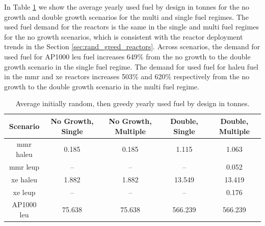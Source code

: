 In Table \ref{tab:rand_greed_used_avg} we show the average yearly used fuel by design in tonnes for the no growth and double growth scenarios for the multi and single fuel regimes. The used fuel demand for the reactors is the same in the single and multi fuel regimes for the no growth scenarios, which is consistent with the reactor deployment trends in the Section \ref{sec:rand_greed_reactors}. Across scenarios, the demand for used fuel for AP1000 \gls{leu} fuel increases 649\% from the no growth to the double growth scenario in the single fuel regime. The demand for used fuel for \gls{haleu} fuel in the \gls{mmr} and \gls{xe} reactors increases 503\% and 620\% respectively from the no growth to the double growth scenario in the multi fuel regime.

  \begin{table}[H]
    \centering
    \caption{Average initially random, then greedy yearly used fuel by design in tonnes.}
    \label{tab:rand_greed_used_avg}
    \begin{tabular}{c c c c c}
       \hline
       Scenario & No Growth, Single & No Growth, Multiple & Double, Single & Double, Multiple  \\
       \hline
       \gls{mmr} \gls{haleu}   & 0.185    & 0.185   & 1.115    & 1.063    \\
       \gls{mmr} \gls{leup}    & --       & --      & --       & 0.052    \\
       \gls{xe} \gls{haleu}    & 1.882    & 1.882   & 13.549   & 13.419   \\
       \gls{xe} \gls{leup}     & --       & --      & --       & 0.176    \\
       AP1000 \gls{leu}        & 75.638   & 75.638  & 566.239  & 566.239  \\
       \hline
    \end{tabular}
  \end{table}
